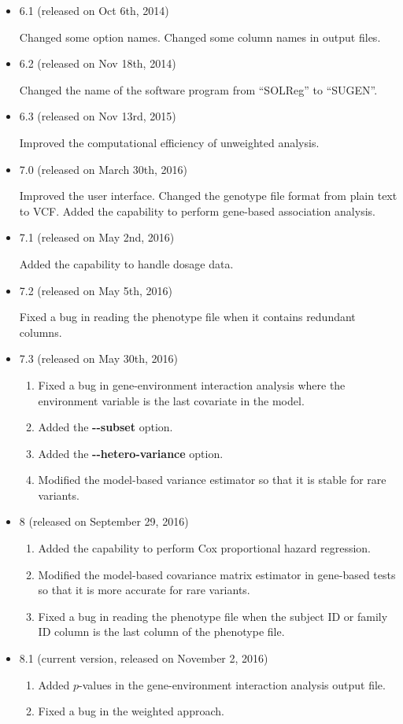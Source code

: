 \documentclass[12pt,letter]{article}
\begin{document}
\begin{itemize}
\item 6.1 (released on Oct 6th, 2014)

Changed some option names. Changed some column names in output files.

\item 6.2 (released on Nov 18th, 2014)

Changed the name of the software program from ``SOLReg'' to ``SUGEN''.

\item 6.3 (released on Nov 13rd, 2015)

Improved the computational efficiency of unweighted analysis.

\item 7.0 (released on March 30th, 2016)

Improved the user interface. Changed the genotype file format from plain text to VCF. Added 
the capability to perform gene-based association analysis.

\item 7.1 (released on May 2nd, 2016)

Added the capability to handle dosage data. 

\item 7.2 (released on May 5th, 2016)

Fixed a bug in reading the phenotype file when it contains redundant columns.

\item 7.3 (released on May 30th, 2016)

\begin{enumerate}
\item Fixed a bug in gene-environment interaction analysis where the environment variable is the last
covariate in the model.
\item Added the {\bf -{}-subset} option.
\item Added the {\bf -{}-hetero-variance} option.
\item Modified the model-based variance estimator so that it is stable
for rare variants.
\end{enumerate}

\item 8 (released on September 29, 2016)

\begin{enumerate}
\item Added the capability to perform Cox proportional hazard regression.
\item Modified the model-based covariance matrix estimator in gene-based tests so that
it is more accurate for rare variants.
\item Fixed a bug in reading the phenotype file when the subject ID or family ID column is the
last column of the phenotype file.
\end{enumerate}

\item 8.1 (current version, released on November 2, 2016)

\begin{enumerate}
\item Added $p$-values in the gene-environment interaction analysis output file.
\item Fixed a bug in the weighted approach.
\end{enumerate}

\end{itemize}
\end{document}
